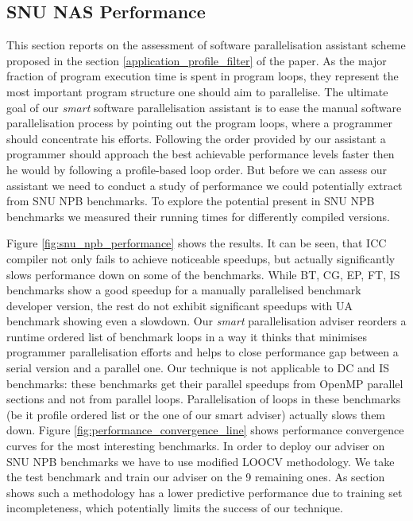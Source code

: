 \documentclass[sigconf,10pt,review,anonymous]{acmart}
\begin{document}
\subsection{SNU NAS Performance}
\label{evaluation_performance}
\quad This section reports on the assessment of software parallelisation assistant scheme proposed in the section \ref{application_profile_filter} of the paper. As the major fraction of program execution time is spent in program loops, they represent the most important program structure one should aim to parallelise. The ultimate goal of our \textit{smart} software parallelisation assistant is to ease the manual software parallelisation process by pointing out the program loops, where a programmer should concentrate his efforts. Following the order provided by our assistant a programmer should approach the best achievable performance levels faster then he would by following a profile-based loop order.\newline\null
\quad But before we can assess our assistant we need to conduct a study of performance we could potentially extract from SNU NPB benchmarks. To explore the potential present in SNU NPB benchmarks we measured their running times for differently compiled versions. 


Figure \ref{fig:snu_npb_performance} shows the results. It can be seen, that ICC compiler not only fails to achieve noticeable speedups, but actually significantly slows performance down on some of the benchmarks. While BT, CG, EP, FT, IS benchmarks show a good speedup for a manually parallelised benchmark developer version, the rest do not exhibit significant speedups with UA benchmark showing even a slowdown.\newline\null
\quad Our \textit{smart} parallelisation adviser reorders a runtime ordered list of benchmark loops in a way it thinks that minimises programmer parallelisation efforts and helps to close performance gap between a serial version and a parallel one. Our technique is not applicable to DC and IS benchmarks: these benchmarks get their parallel speedups from OpenMP parallel sections and not from parallel loops. Parallelisation of loops in these benchmarks (be it profile ordered list or the one of our smart adviser) actually slows them down. Figure \ref{fig:performance_convergence_line} shows performance convergence curves for the most interesting benchmarks.
\quad In order to deploy our adviser on SNU NPB benchmarks we have to use modified LOOCV methodology. We take the test benchmark and train our adviser on the 9 remaining ones. As section \label{loocv_accuracy} shows such a methodology has a lower predictive performance due to training set incompleteness, which potentially limits the success of our technique.   
\end{document}
